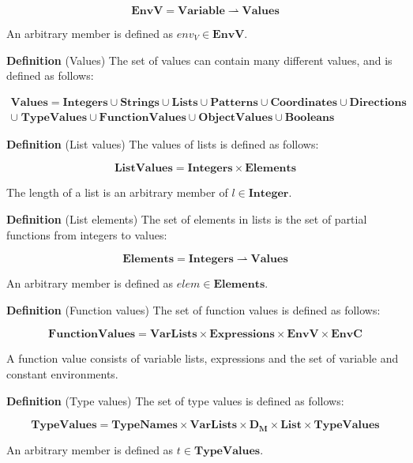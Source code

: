 \[
  \mathbf{EnvV} = \mathbf{Variable} \rightharpoonup \mathbf{Values}
\]


An arbitrary member is defined as $env_{V} \in \mathbf{EnvV}$.

\textbf{Definition} (Values) \hspace{0.5cm} The set of values can contain many
different values, and is defined as follows:

\begin{align*}
 \mathbf{Values} = \mathbf{Integers} \cup \mathbf{Strings} \cup \mathbf{Lists}
 \cup \mathbf{Patterns} \cup \mathbf{Coordinates} \cup \mathbf{Directions}\\ 
 \cup\; \mathbf{TypeValues} \cup \mathbf{FunctionValues} \cup \mathbf{ObjectValues} 
 \cup \mathbf{Booleans}
\end{align*}

\textbf{Definition} (List values) \hspace{0.5cm} The values of lists is
defined as follows:

\[
  \mathbf{ListValues} = \mathbf{Integers} \times \mathbf{Elements}
\]

The length of a list is an arbitrary member of $l \in \mathbf{Integer}$.

\textbf{Definition} (List elements) \hspace{0.5cm} The set of elements in
lists is the set of partial functions from integers to values:

\[
  \mathbf{Elements} = \mathbf{Integers} \rightharpoonup \mathbf{Values}
\]

An arbitrary member is defined as $elem \in \mathbf{Elements}$.

\textbf{Definition} (Function values) \hspace{0.5cm} The set of function values
is defined as follows:
 
\[
  \mathbf{FunctionValues} = \mathbf{VarLists} \times \mathbf{Expressions} \times
  \mathbf{EnvV} \times \mathbf{EnvC}
\]

A function value consists of variable lists, expressions and the set of variable
and constant environments.

\textbf{Definition} (Type values) \hspace{0.5cm} The set of type values is
defined as follows:

\[
  \mathbf{TypeValues} = \mathbf{TypeNames} \times \mathbf{VarLists} \times
  \mathbf{D_{M}} \times \mathbf{List} \times \mathbf{TypeValues }
\]

An arbitrary member is defined as $t \in \mathbf{TypeValues}$.

